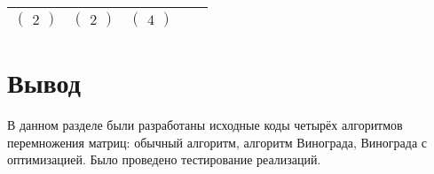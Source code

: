 \begin{table}[h]
\begin{center}
\begin{tabular}{|c|c|c|c|c|}
		$\begin{pmatrix}
			2
		\end{pmatrix}$ &
		$\begin{pmatrix}
			2
		\end{pmatrix}$ &
		$\begin{pmatrix}
			4
		\end{pmatrix}$ \\ \hline

		\end{tabular}
	\end{center}
\end{table}


\section*{Вывод}

В данном разделе были разработаны исходные коды четырёх алгоритмов перемножения матриц: обычный алгоритм, алгоритм Винограда, Винограда с оптимизацией. Было проведено тестирование реализаций. 
